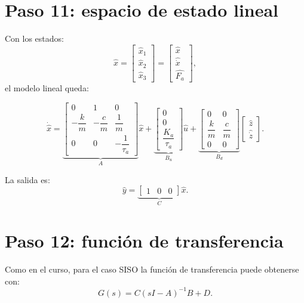 \documentclass[11pt]{article}
\begin{document}
\section{Paso 11: espacio de estado lineal}

Con los estados:
\[
\hat{x}=
\begin{bmatrix}
\hat{x}_1\\
\hat{x}_2\\
\hat{x}_3
\end{bmatrix}
=
\begin{bmatrix}
\hat{x}\\
\widehat{\dot{x}}\\
\widehat{F_a}
\end{bmatrix},
\]
el modelo lineal queda:

\begin{equation}
\dot{\hat{x}}=
\underbrace{
\begin{bmatrix}
0 & 1 & 0\\
-\dfrac{k}{m} & -\dfrac{c}{m} & \dfrac{1}{m}\\
0 & 0 & -\dfrac{1}{\tau_a}
\end{bmatrix}
}_{A}
\hat{x}
+
\underbrace{
\begin{bmatrix}
0\\
0\\
\dfrac{K_a}{\tau_a}
\end{bmatrix}
}_{B_u}
\hat{u}
+
\underbrace{
\begin{bmatrix}
0 & 0\\
\dfrac{k}{m} & \dfrac{c}{m}\\
0 & 0
\end{bmatrix}
}_{B_d}
\begin{bmatrix}
\hat{z}\\
\widehat{\dot{z}}
\end{bmatrix}.
\label{eq:ss_linear}
\end{equation}

La salida es:
\begin{equation}
\hat{y}=
\underbrace{
\begin{bmatrix}
1 & 0 & 0
\end{bmatrix}
}_{C}
\hat{x}.
\end{equation}

\section{Paso 12: funci\'on de transferencia}

Como en el curso, para el caso SISO la funci\'on de transferencia puede obtenerse con:
\[
G(s)=C(sI-A)^{-1}B + D.
\]
\end{document}
